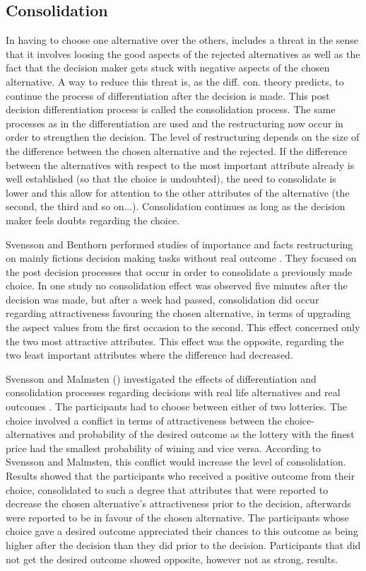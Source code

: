 \subsection{Consolidation}

In having to choose one alternative over the others, includes a threat
in the sense that it involves loosing the good aspects of the rejected
alternatives as well as the fact that the decision maker gets stuck
with negative aspects of the chosen alternative.  A way to reduce this
threat is, as the diff. con. theory predicts, to continue the process
of differentiation after the decision is made.  This post decision
differentiation process is called the consolidation process.  The same
processes as in the differentiation are used and the restructuring now
occur in order to strengthen the decision.  The level of restructuring
depends on the size of the difference between the chosen alternative
and the rejected.  If the difference between the alternatives with
respect to the most important attribute already is well established
(so that the choice is undoubted), the need to consolidate is lower
and this allow for attention to the other attributes of the
alternative (the second, the third and so on...).  Consolidation
continues as long as the decision maker feels doubts regarding the
choice.

Svensson and Benthorn performed studies of importance and facts
restructuring on mainly fictions decision making tasks without real
outcome \parencite{svensson92a}.  They focused on the post
decision processes that occur in order to consolidate a previously
made choice.  In one study \parencite{svensson92a} no
consolidation effect was observed five minutes after the decision was
made, but after a week had passed, consolidation did occur regarding
attractiveness favouring the chosen alternative,  in terms of
upgrading the aspect values from the first occasion to the second.
This effect concerned only the two most attractive attributes.  This
effect was the opposite, regarding the two least important attributes
where the difference had decreased.

Svensson and Malmsten (\citeyear{SvenssonMalmsten95}) investigated the
effects of differentiation and consolidation processes regarding
decisions with real life alternatives and real outcomes
\parencite{SvenssonMalmsten95}. The participants had to choose between
either of two lotteries. The choice involved a conflict in terms of
attractiveness between the choice-alternatives and probability of the
desired outcome as the lottery with the finest price had the smallest
probability of wining and vice versa.  According to Svensson and
Malmsten, this conflict would increase the level of consolidation.
Results showed that the participants who received a positive outcome
from their choice, consolidated to such a degree that attributes that
were reported to decrease the chosen alternative's attractiveness
prior to the decision, afterwards were reported to be in favour of the
chosen alternative.  The participants whose choice gave a desired
outcome appreciated their chances to this outcome as being higher
after the decision than they did prior to the decision.  Participants
that did not get the desired outcome showed opposite, however not as
strong, results.

